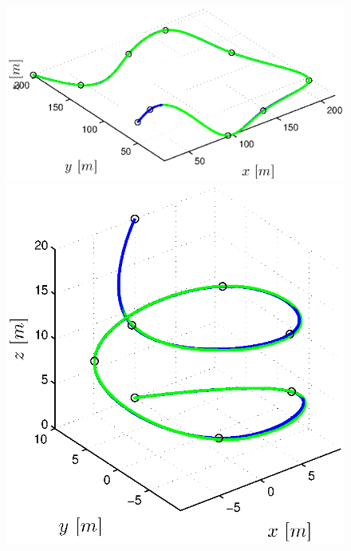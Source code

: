 \begin{figure}[h]
\begin{minipage}[t]{0.32\textwidth}
  \end{minipage}
  \vspace{5pt}
  \begin{minipage}[t]{0.32\textwidth}
    \includegraphics[width = \textwidth]{trackings/figure_3D_road_SplineDegree3_crossTrack_Disturbance_1}
  \end{minipage}
  \hfill
  \begin{minipage}[t]{0.32\textwidth}
    \includegraphics[width = \textwidth]{trackings/figure_3D_helix_SplineDegree3_crossTrack_Disturbance_1}
  \end{minipage}
  \hfill
  \begin{minipage}[t]{0.32\textwidth}

\end{minipage}
\end{figure}
